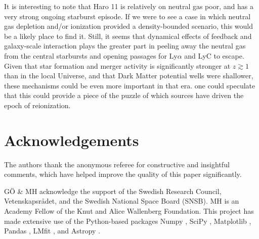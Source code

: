 \documentclass[twocolumn,]{aastex61}
\begin{document}
It is interesting to note that Haro 11 is relatively on neutral 
gas poor, and has a very strong ongoing starburst episode. If we were to see a 
case in which neutral gas depletion and/or ionization provided a 
density-bounded scenario, this would be a likely place to find it. 
Still, it seems that dynamical effects of feedback and galaxy-scale 
interaction plays the greater part in peeling away the neutral gas from the 
central starbursts and opening passages for Ly$\alpha$ and LyC to 
escape. Given that star formation and merger activity is significantly stronger 
at $z\gtrsim 1$ than in the local Universe, and that Dark Matter potential wells
were shallower, these mechanisms could be even more important in that era. 
one could speculate that this could provide a piece of the puzzle of which
sources have driven the epoch of reionization.


\section*{Acknowledgements}\label{acknowledgements}

The authors thank the anonymous referee for constructive and insightful 
comments, which have helped improve the quality of this paper significantly. 

GÖ \& MH acknowledge the support of the Swedish Research Council,
Vetenskapsrådet, and the Swedish National Space Board (SNSB). MH is an
Academy Fellow of the Knut and Alice Wallenberg Foundation. This project
has made extensive use of the Python-based packages Numpy \citep{Numpy},
SciPy \citep{SciPy}, Matplotlib \citep{Matplotlib}, Pandas
\citep{Pandas}, LMfit \citep{lmfit2014}, and Astropy
\citep{Astropy2013}.



\end{document}
